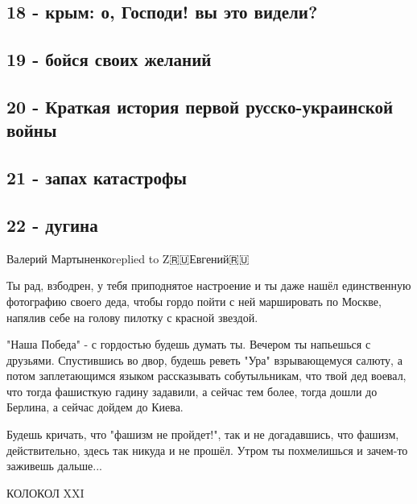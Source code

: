 \subsection{18 - крым: о, Господи! вы это видели?}

\subsection{19 - бойся своих желаний}

\subsection{20 - Краткая история первой русско-украинской войны}

\subsection{21 - запах катастрофы}

\subsection{22 - дугина}

Валерий Мартыненкоreplied to Z🇷🇺Евгений🇷🇺

Ты рад, взбодрен, у тебя приподнятое настроение и ты даже нашёл единственную
фотографию своего деда, чтобы гордо пойти с ней маршировать по Москве, напялив
себе на голову пилотку с красной звездой.

"Наша Победа" - с гордостью будешь думать ты. Вечером ты напьешься с друзьями.
Спустившись во двор, будешь реветь "Ура" взрывающемуся салюту, а потом
заплетающимся языком рассказывать собутыльникам, что твой дед воевал, что тогда
фашисткую гадину задавили, а сейчас тем более, тогда дошли
до Берлина, а сейчас дойдем до Киева.

Будешь кричать, что "фашизм не пройдет!", так и не догадавшись, что фашизм,
действительно, здесь так никуда и не прошёл. Утром ты похмелишься и зачем-то
заживешь дальше...

КОЛОКОЛ XXI

